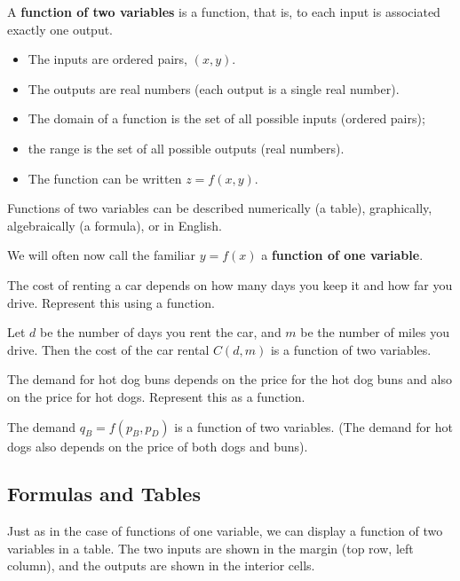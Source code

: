 \begin{definition}
A {\bf function of two variables} is a function, that is, to each input is associated exactly one output.
    \begin{itemize}
    \item The inputs are ordered pairs, $(x,y)$.
    \item The outputs are real numbers (each output is a single real number).
    \item The domain of a function is the set of all possible inputs (ordered pairs);
    \item the range is the set of all possible outputs (real numbers).
    \item The function can be written $z=f(x,y)$.
    \end{itemize}
Functions of two variables can be described numerically (a table), graphically, algebraically (a formula), or in English.
\end{definition}
We will often now call the familiar $y=f(x)$ a {\bf function of one variable}.

\begin{example}
The cost of renting a car depends on how many days you keep it and how far you drive. Represent this using a function.

\begin{solution} Let $d$ be the number of days you rent the car, and $m$ be the number of miles you drive. Then the cost of the car rental $C(d,m)$ is a function of two variables.
\end{solution}\end{example}

\begin{example}
The demand for hot dog buns depends on the price for the hot dog buns and also on the price for hot dogs. Represent this as a function.

\begin{solution} The demand $q_B=f(p_B,p_D)$ is a function of two variables. (The demand for hot dogs also depends on the price of both dogs and buns).
\end{solution}\end{example}

\subsection{Formulas and Tables}
Just as in the case of functions of one variable, we can display a function of two variables in a table. The two inputs are shown in the margin (top row, left column), and the outputs are shown in the interior cells.

